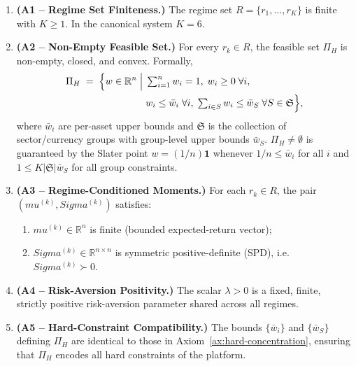 \documentclass[12pt,openany]{book}
\newcommand{\bfw}{\mathbf{w}}
\newcommand{\bfmu}{\boldsymbol{\mu}}
\newcommand{\bfSigma}{\boldsymbol{\Sigma}}
\newcommand{\bfone}{\mathbf{1}}
\numberwithin{equation}{chapter}
\theoremstyle{plain}
\theoremstyle{definition}
\theoremstyle{remark}
\def\mathcal#1{#1}%
\def\bfw{w}%
\def\bfmu{mu}%
\def\bfSigma{Sigma}%
\begin{document}
\begin{enumerate}
  \item \textbf{(A1 -- Regime Set Finiteness.)}
        The regime set $\mathcal{R} = \{r_1, \dots, r_K\}$ is finite
        with $K \geq 1$.  In the canonical system $K = 6$.

  \item \textbf{(A2 -- Non-Empty Feasible Set.)}
        For every $r_k \in \mathcal{R}$, the feasible set $\Pi_H$ is
        non-empty, closed, and convex.  Formally,
        \begin{align}
          \Pi_H
          \;=\;
          \Bigl\{
            \bfw \in \mathbb{R}^n
            \;\Big|\;
            &\textstyle\sum_{i=1}^n w_i = 1,\;
             w_i \geq 0\;\forall i,\nonumber\\
            &w_i \leq \bar{w}_i\;\forall i,\;
             \textstyle\sum_{i \in \mathcal{S}} w_i \leq \bar{w}_{\mathcal{S}}
             \;\forall \mathcal{S} \in \mathfrak{S}
          \Bigr\},
          \label{eq:Pi-H-def}
        \end{align}
        where $\bar{w}_i$ are per-asset upper bounds and
        $\mathfrak{S}$ is the collection of sector/currency
        groups with group-level upper bounds $\bar{w}_{\mathcal{S}}$.
        $\Pi_H \neq \emptyset$ is guaranteed by the Slater point
        $\bfw = (1/n)\bfone$ whenever $1/n \leq \bar{w}_i$ for
        all $i$ and $1 \leq K|\mathfrak{S}|\bar{w}_{\mathcal{S}}$ for
        all group constraints.

  \item \textbf{(A3 -- Regime-Conditioned Moments.)}
        For each $r_k \in \mathcal{R}$, the pair
        $(\bfmu^{(k)}, \bfSigma^{(k)})$ satisfies:
        \begin{enumerate}
          \item $\bfmu^{(k)} \in \mathbb{R}^n$ is finite
                (bounded expected-return vector);
          \item $\bfSigma^{(k)} \in \mathbb{R}^{n \times n}$ is
                symmetric positive-definite (SPD), i.e.\
                $\bfSigma^{(k)} \succ 0$.
        \end{enumerate}

  \item \textbf{(A4 -- Risk-Aversion Positivity.)}
        The scalar $\lambda > 0$ is a fixed, finite, strictly
        positive risk-aversion parameter shared across all regimes.

  \item \textbf{(A5 -- Hard-Constraint Compatibility.)}
        The bounds $\{\bar{w}_i\}$ and $\{\bar{w}_{\mathcal{S}}\}$
        defining $\Pi_H$ are identical to those in
        Axiom~\ref{ax:hard-concentration}, ensuring that
        $\Pi_H$ encodes all hard constraints of the platform.
\end{enumerate}
\end{document}
